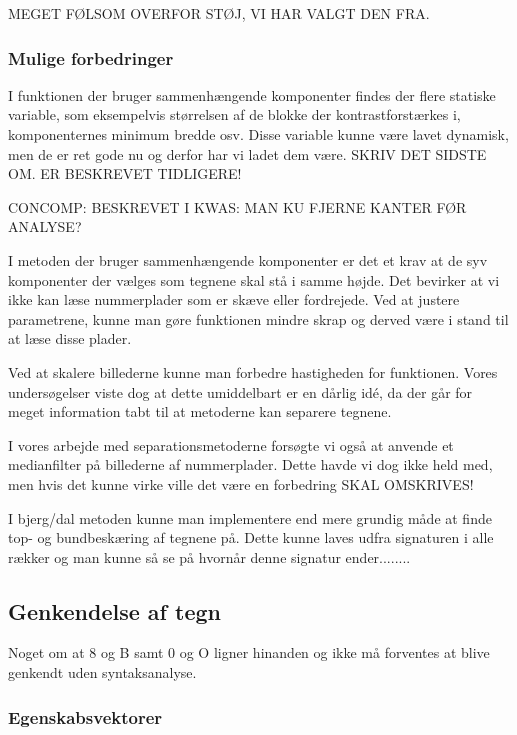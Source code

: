 MEGET FØLSOM OVERFOR STØJ, VI HAR VALGT DEN FRA.


\subsubsection{Mulige forbedringer}

I funktionen der bruger sammenhængende komponenter findes der flere statiske variable, som eksempelvis størrelsen af de blokke der kontrastforstærkes i, komponenternes minimum bredde osv. Disse variable kunne være lavet dynamisk, men de er ret gode nu og derfor har vi ladet dem være. SKRIV DET SIDSTE OM. ER BESKREVET TIDLIGERE!

CONCOMP: BESKREVET I KWAS: MAN KU FJERNE KANTER FØR ANALYSE?

I metoden der bruger sammenhængende komponenter er det et krav at de syv komponenter der vælges som tegnene skal stå i samme højde. Det bevirker at vi ikke kan læse nummerplader som er skæve eller fordrejede. Ved at justere parametrene, kunne man gøre funktionen mindre skrap og derved være i stand til at læse disse plader.

Ved at skalere billederne kunne man forbedre hastigheden for funktionen. Vores undersøgelser viste dog at dette umiddelbart er en dårlig idé, da der går for meget information tabt til at metoderne kan separere tegnene.

I vores arbejde med separationsmetoderne forsøgte vi også at anvende et medianfilter på billederne af nummerplader. Dette havde vi dog ikke held med, men hvis det kunne virke ville det være en forbedring SKAL OMSKRIVES!

I bjerg/dal metoden kunne man implementere end mere grundig måde at finde top- og bundbeskæring af tegnene på. Dette kunne laves udfra signaturen i alle rækker og man kunne så se på hvornår denne signatur ender........



\subsection{Genkendelse af tegn}

Noget om at 8 og B samt 0 og O ligner hinanden og ikke må forventes at blive genkendt uden syntaksanalyse.

\subsubsection{Egenskabsvektorer}

